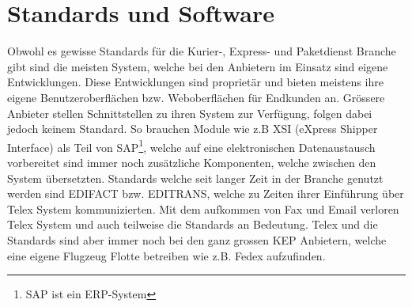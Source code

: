 \section{Standards und Software}
Obwohl es gewisse Standards für die Kurier-, Express- und Paketdienst Branche gibt sind die meisten System, welche bei den Anbietern im Einsatz sind eigene Entwicklungen. Diese Entwicklungen sind proprietär und bieten meistens ihre eigene Benutzeroberflächen bzw. Weboberflächen für Endkunden an. Grössere Anbieter stellen Schnittstellen zu ihren System zur Verfügung, folgen dabei jedoch keinem Standard. So brauchen Module wie z.B XSI (eXpress Shipper Interface) als Teil von SAP\footnote{SAP ist ein ERP-System}, welche auf eine elektronischen Datenaustausch vorbereitet sind immer noch zusätzliche Komponenten, welche zwischen den System übersetzten.
\newline{}
Standards welche seit langer Zeit in der Branche genutzt werden sind EDIFACT bzw. EDITRANS, welche zu Zeiten ihrer Einführung über Telex System kommunizierten. Mit dem aufkommen von Fax und Email verloren Telex System und auch teilweise die Standards an Bedeutung. Telex und die Standards sind aber immer noch bei den ganz grossen KEP Anbietern, welche eine eigene Flugzeug Flotte betreiben wie z.B. Fedex aufzufinden.


